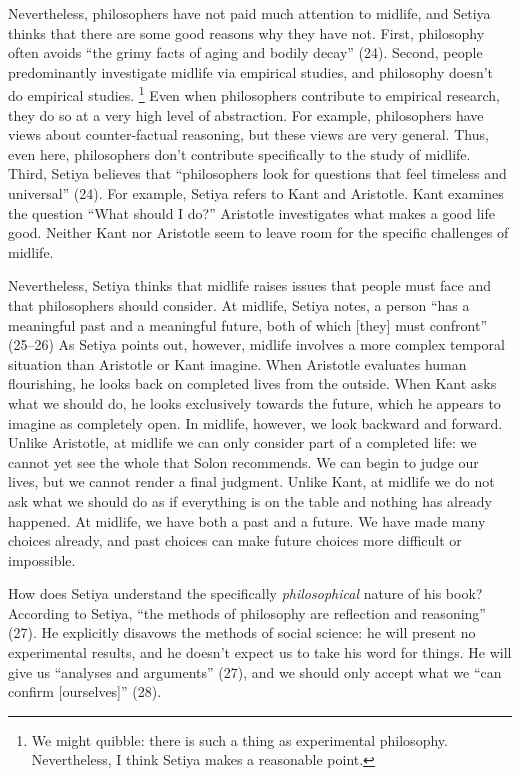 \documentclass[12pt,letterpaper]{article}
\begin{document}
Nevertheless, philosophers have not paid much attention to midlife, and Setiya thinks that there are some good reasons why they have not.
First, philosophy often avoids ``the grimy facts of aging and bodily decay'' (24).
Second, people predominantly investigate midlife via empirical studies, and philosophy doesn't do empirical studies.%
\footnote{We might quibble: there is such a thing as experimental philosophy.
Nevertheless, I think Setiya makes a reasonable point.}
Even when philosophers contribute to empirical research, they do so at a very high level of abstraction.
For example, philosophers have views about counter-factual reasoning, but these views are very general.
Thus, even here, philosophers don't contribute specifically to the study of midlife.
Third, Setiya believes that ``philosophers look for questions that feel  timeless and universal'' (24).
For example, Setiya refers to Kant and Aristotle.
Kant examines the question ``What should I do?''
Aristotle investigates what makes a good life good.
Neither Kant nor Aristotle seem to leave room for the specific challenges of midlife.

Nevertheless, Setiya thinks that midlife raises issues that people must face and that philosophers should consider.
At midlife, Setiya notes, a person ``has a meaningful past and a meaningful future, both of which [they] must confront'' (25--26)
As Setiya points out, however, midlife involves a more complex temporal situation than Aristotle or Kant imagine.
When Aristotle evaluates human flourishing, he looks back on completed lives from the outside.
When Kant asks what we should do, he looks exclusively towards the future, which he appears to imagine as completely open.
In midlife, however, we look backward and forward.
Unlike Aristotle, at midlife we can only consider part of a completed life: we cannot yet see the whole that Solon recommends.
We can begin to judge our lives, but we cannot render a final judgment.
Unlike Kant, at midlife we do not ask what we should do as if everything is on the table and nothing has already happened.
At midlife, we have both a past and a future.
We have made many choices already, and past choices can make future choices more difficult or impossible.

How does Setiya understand the specifically \textit{philosophical} nature of his book?
According to Setiya, ``the methods of philosophy are reflection and reasoning'' (27).
He explicitly disavows the methods of social science: he will present no experimental results, and he doesn't expect us to take his word for things.
He will give us ``analyses and arguments'' (27), and we should only accept what we ``can confirm [ourselves]'' (28).
\end{document}
